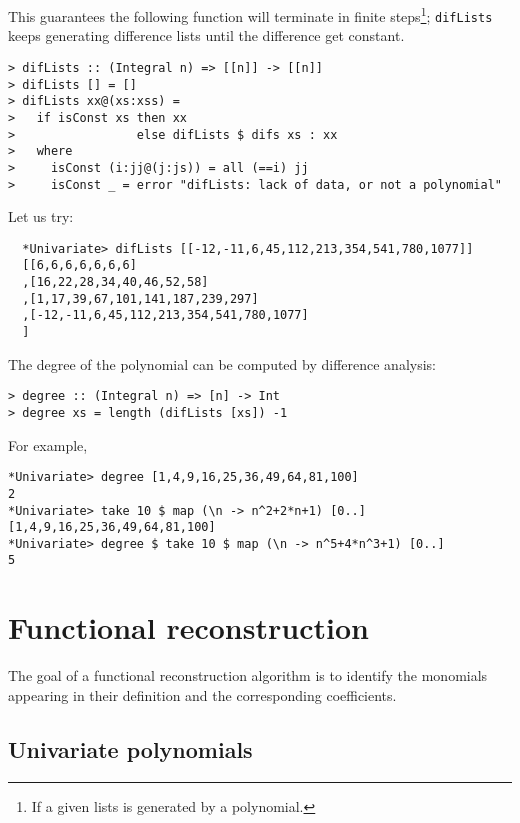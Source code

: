 \documentclass[11pt]{book}
\begin{document}
This guarantees the following function will terminate in finite steps\footnote{
If a given lists is generated by a polynomial.
}; \texttt{difLists} keeps generating difference lists until the difference get constant.
\begin{verbatim}
> difLists :: (Integral n) => [[n]] -> [[n]]
> difLists [] = []
> difLists xx@(xs:xss) =
>   if isConst xs then xx
>                 else difLists $ difs xs : xx
>   where
>     isConst (i:jj@(j:js)) = all (==i) jj
>     isConst _ = error "difLists: lack of data, or not a polynomial"
\end{verbatim}
Let us try:
\begin{verbatim}
  *Univariate> difLists [[-12,-11,6,45,112,213,354,541,780,1077]]
  [[6,6,6,6,6,6,6]
  ,[16,22,28,34,40,46,52,58]
  ,[1,17,39,67,101,141,187,239,297]
  ,[-12,-11,6,45,112,213,354,541,780,1077]
  ]
\end{verbatim}

The degree of the polynomial can be computed by difference analysis:
\begin{verbatim}
> degree :: (Integral n) => [n] -> Int
> degree xs = length (difLists [xs]) -1
\end{verbatim}
For example,
\begin{verbatim}
*Univariate> degree [1,4,9,16,25,36,49,64,81,100]
2
*Univariate> take 10 $ map (\n -> n^2+2*n+1) [0..]
[1,4,9,16,25,36,49,64,81,100]
*Univariate> degree $ take 10 $ map (\n -> n^5+4*n^3+1) [0..]
5
\end{verbatim}

\chapter{Functional reconstruction}
The goal of a functional reconstruction algorithm is to identify the monomials appearing in their definition and the corresponding coefficients.

\section{Univariate polynomials}
\end{document}
